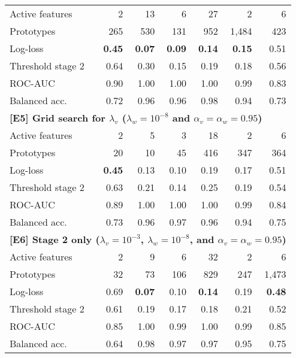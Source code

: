 \begin{table}
\begin{center}
\begin{tabular}{|lrrrrrr|}
Active features&2&13&6&27&2&6\\
Prototypes&265&530&131&952&1,484&423\\
Log-loss&\textbf{0.45}&\textbf{0.07}&\textbf{0.09}&\textbf{0.14}&\textbf{0.15}&0.51\\
Threshold stage 2&0.64&0.30&0.15&0.19&0.18&0.56\\
ROC-AUC&0.90&1.00&1.00&1.00&0.99&0.83\\
Balanced acc.&0.72&0.96&0.96&0.98&0.94&0.73\\
\multicolumn{7}{|l|}{\textbf{[E5] Grid search for $\lambda_v$ ($\lambda_w=10^{-8}$ and $\alpha_v=\alpha_w=0.95$)}}\\
Active features&2&5&3&18&2&6\\
Prototypes&20&10&45&416&347&364\\
Log-loss&\textbf{0.45}&0.13&0.10&0.19&0.17&0.51\\
Threshold stage 2&0.63&0.21&0.14&0.25&0.19&0.54\\
ROC-AUC&0.89&1.00&1.00&1.00&0.99&0.84\\
Balanced acc.&0.73&0.96&0.97&0.96&0.94&0.75\\
\multicolumn{7}{|l|}{\textbf{[E6] Stage 2 only  ($\lambda_v=10^{-3}$, $\lambda_w=10^{-8}$, and $\alpha_v=\alpha_w=0.95$)}}\\
Active features&2&9&6&32&2&6\\
Prototypes&32&73&106&829&247&1,473\\
Log-loss&0.69&\textbf{0.07}&0.10&\textbf{0.14}&0.19&\textbf{0.48}\\
Threshold stage 2&0.61&0.19&0.17&0.18&0.21&0.52\\
ROC-AUC&0.85&1.00&0.99&1.00&0.99&0.85\\
Balanced acc.&0.64&0.98&0.97&0.97&0.95&0.75\\
\hline
\end{tabular}
\end{center}
\end{table}
%

